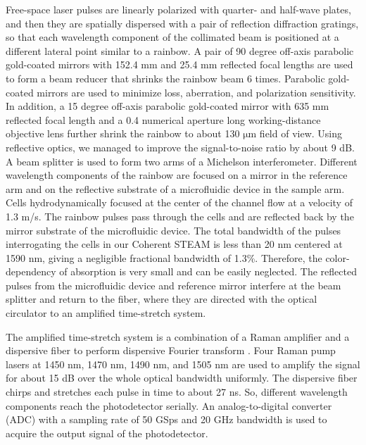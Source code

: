Free-space laser pulses are linearly polarized with quarter- and half-wave plates, and then they are spatially dispersed with a pair of reflection diffraction gratings, so that each wavelength component of the collimated beam is positioned at a different lateral point similar to a rainbow. A pair of 90 degree off-axis parabolic gold-coated mirrors with 152.4 mm and 25.4 mm reflected focal lengths are used to form a beam reducer that shrinks the rainbow beam 6 times. Parabolic gold-coated mirrors are used to minimize loss, aberration, and polarization sensitivity. In addition, a 15 degree off-axis parabolic gold-coated mirror with 635 mm reflected focal length and a 0.4 numerical aperture long working-distance objective lens further shrink the rainbow to about 130 $\mathrm{\mu}$m field of view. Using reflective optics, we managed to improve the signal-to-noise ratio by about 9 dB. A beam splitter is used to form two arms of a Michelson interferometer. Different wavelength components of the rainbow are focused on a mirror in the reference arm and on the reflective substrate of a microfluidic device in the sample arm. Cells hydrodynamically focused at the center of the channel flow at a velocity of 1.3 m/s. The rainbow pulses pass through the cells and are reflected back by the mirror substrate of the microfluidic device. The total bandwidth of the pulses interrogating the cells in our Coherent STEAM is less than 20 nm centered at 1590 nm, giving a negligible fractional bandwidth of 1.3\%. Therefore, the color-dependency of absorption is very small and can be easily neglected. The reflected pulses from the microfluidic device and reference mirror interfere at the beam splitter and return to the fiber, where they are directed with the optical circulator to an amplified time-stretch system.

The amplified time-stretch system is a combination of a Raman amplifier and a dispersive fiber to perform dispersive Fourier transform \cite{goda2013dispersive}. Four Raman pump lasers at 1450 nm, 1470 nm, 1490 nm, and 1505 nm are used to amplify the signal for about 15 dB over the whole optical bandwidth uniformly. The dispersive fiber chirps and stretches each pulse in time to about 27 ns. So, different wavelength components reach the photodetector serially. An analog-to-digital converter (ADC) with a sampling rate of 50 GSps and 20 GHz bandwidth is used to acquire the output signal of the photodetector.

